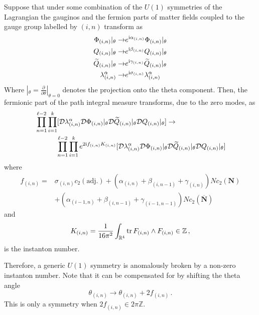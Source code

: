 \documentclass[main.tex]{subfiles}
\begin{document}
Suppose that under some combination of the $U(1)$ symmetries of the Lagrangian the gauginos and the fermion parts of matter fields coupled to the gauge group labelled by $(i,n)$ transform as 
\begin{align}
\Phi_{(i,n)}|_{\theta}\to& e^{\mathrm{i}\alpha_{(i,n)}}\Phi_{(i,n)}|_{\theta}\\
Q_{(i,n)}|_{\theta}\to& e^{\mathrm{i}\beta_{(i,n)}}Q_{(i,n)}|_{\theta}\\
\widetilde{Q}_{(i,n)}|_{\theta}\to& e^{\mathrm{i}\gamma_{(i,n)}}\widetilde{Q}_{(i,n)}|_{\theta}\\
\lambda^{\alpha}_{(i,n)}\to& e^{\mathrm{i}\sigma_{(i,n)}}\lambda^{\alpha}_{(i,n)}
\end{align}
Where $|_{\theta}=\frac{\partial}{\partial\theta}|_{\theta=0}$ denotes the projection onto the theta component. Then, the fermionic part of the path integral measure transforms, due to the zero modes, as
\begin{equation}
\begin{split}
&\prod_{n=1}^{\ell-2}\prod_{i=1}^{k}[\mathcal{D}\lambda^{\alpha}_{(i,n)}\mathcal{D}\Phi_{(i,n)}|_{\theta}\mathcal{D}\widetilde{Q}_{(i,n)}|_{\theta}\mathcal{D}Q_{(i,n)}|_{\theta}]\to\\
&\qquad\quad\prod_{n=1}^{\ell-2}\prod_{i=1}^{k}e^{2\mathrm{i} f_{(i,n)}K_{(i,n)}}[\mathcal{D}\lambda^{\alpha}_{(i,n)}\mathcal{D}\Phi_{(i,n)}|_{\theta}\mathcal{D}\widetilde{Q}_{(i,n)}|_{\theta}\mathcal{D}Q_{(i,n)}|_{\theta}]
\end{split}
\end{equation}
where
\begin{equation}
\begin{aligned}
f_{(i,n)}=&\sigma_{(i,n)}c_2(\text{adj.})+(\alpha_{(i,n)}+\beta_{(i,n-1)}+\gamma_{(i,n)})Nc_2(\mathbf{N})\\
&+(\alpha_{(i-1,n)}+\beta_{(i,n-1)}+\gamma_{(i-1,n-1)})Nc_2(\overline{\mathbf{N}})
\end{aligned}
\end{equation}
and 
\begin{equation}
K_{(i,n)}=\frac{1}{16\pi^2}\int_{\mathbb{R}^4}\operatorname{tr}{ F_{(i,n)}\wedge F_{(i,n)}}\in\mathbb{Z}\,,
\end{equation}
is the instanton number.

Therefore, a generic $U(1)$ symmetry is anomalously broken by a non-zero instanton number. Note that it can be compensated for by shifting the theta angle
\begin{equation}
 \theta_{(i,n)}\to\theta_{(i,n)}+2f_{(i,n)}\,.
\end{equation}
This is only a symmetry when $2f_{(i,n)}\in2\pi\mathbb{Z}$.
\end{document}
